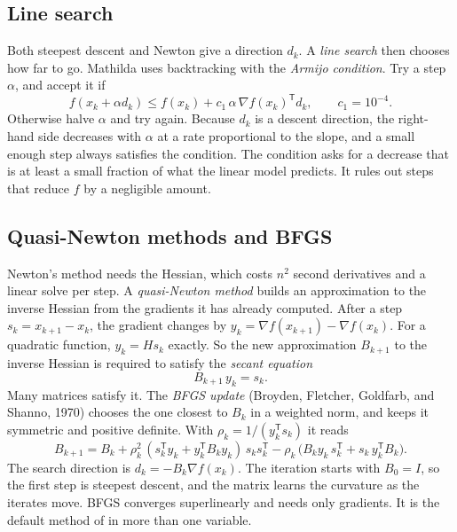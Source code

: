 \subsection{Line search}

Both steepest descent and Newton give a direction \(d_k\). A \emph{line
search} then chooses how far to go. Mathilda uses
backtracking with the \emph{Armijo condition}. Try a
step \(\alpha\), and accept it if
\[
  f(x_k + \alpha d_k) \le f(x_k) + c_1\, \alpha\, \nabla f(x_k)^{\mathsf T} d_k ,
  \qquad c_1 = 10^{-4}.
\]
Otherwise halve \(\alpha\) and try again. Because \(d_k\) is a descent
direction, the right-hand side decreases with \(\alpha\) at a rate proportional
to the slope, and a small enough step always satisfies the condition. The
condition asks for a decrease that is at least a small fraction of what the
linear model predicts. It rules out steps that reduce \(f\) by a negligible
amount.

\subsection{Quasi-Newton methods and BFGS}

Newton's method needs the Hessian, which costs \(n^2\) second derivatives and a
linear solve per step. A \emph{quasi-Newton method}
builds an approximation to the inverse Hessian from the gradients it has
already computed. After a step \(s_k = x_{k+1} - x_k\), the gradient changes by
\(y_k = \nabla f(x_{k+1}) - \nabla f(x_k)\). For a quadratic function,
\(y_k = H s_k\) exactly. So the new approximation \(B_{k+1}\) to the inverse
Hessian is required to satisfy the \emph{secant equation}
\[
  B_{k+1}\, y_k = s_k .
\]
Many matrices satisfy it. The \emph{BFGS update} (Broyden,
Fletcher, Goldfarb, and Shanno, 1970) chooses the one closest to \(B_k\) in a
weighted norm, and keeps it symmetric and positive definite. With
\(\rho_k = 1/(y_k^{\mathsf T} s_k)\) it reads
\[
  B_{k+1} = B_k
    + \rho_k^2\,(s_k^{\mathsf T} y_k + y_k^{\mathsf T} B_k y_k)\, s_k s_k^{\mathsf T}
    - \rho_k\,\bigl(B_k y_k\, s_k^{\mathsf T} + s_k\, y_k^{\mathsf T} B_k\bigr).
\]
The search direction is \(d_k = -B_k \nabla f(x_k)\). The iteration starts with
\(B_0 = I\), so the first step is steepest descent, and the matrix learns the
curvature as the iterates move. BFGS converges superlinearly and needs only
gradients. It is the default method of  in more than one
variable.

